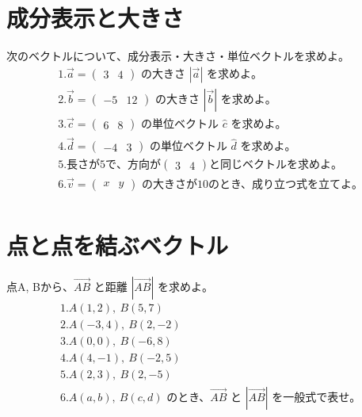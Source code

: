 \documentclass[paper=b4j,landscape,twocolumn,fleqn]{jlreq}
\begin{document}
\section{成分表示と大きさ}
次のベクトルについて、成分表示・大きさ・単位ベクトルを求めよ。
\begin{align*}
　&1.　\vec{a}=\begin{pmatrix}3 & 4\end{pmatrix}\text{ の大きさ }|\vec{a}|\text{ を求めよ。}\\[0.45em]
　&2.　\vec{b}=\begin{pmatrix}-5 & 12\end{pmatrix}\text{ の大きさ }|\vec{b}|\text{ を求めよ。}\\[0.45em]
　&3.　\vec{c}=\begin{pmatrix}6 & 8\end{pmatrix}\text{ の単位ベクトル }\hat{c}\text{ を求めよ。}\\[0.45em]
　&4.　\vec{d}=\begin{pmatrix}-4 & 3\end{pmatrix}\text{ の単位ベクトル }\hat{d}\text{ を求めよ。}\\[0.45em]
　&5.　長さが5で、方向が \begin{pmatrix}3 & 4\end{pmatrix} と同じベクトルを求めよ。\\[0.45em]
　&6.　\vec{v}=\begin{pmatrix}x & y\end{pmatrix}\text{ の大きさが10のとき、成り立つ式を立てよ。}\\[0.45em]
\end{align*}

\section{点と点を結ぶベクトル}
点A, Bから、\(\overrightarrow{AB}\) と距離 \(\left|\overrightarrow{AB}\right|\) を求めよ。
\begin{align*}
　&1.　A(1,2),\ B(5,7)\\[0.45em]
　&2.　A(-3,4),\ B(2,-2)\\[0.45em]
　&3.　A(0,0),\ B(-6,8)\\[0.45em]
　&4.　A(4,-1),\ B(-2,5)\\[0.45em]
　&5.　A(2,3),\ B(2,-5)\\[0.45em]
　&6.　A(a,b),\ B(c,d)\text{ のとき、}\overrightarrow{AB}\text{ と }|\overrightarrow{AB}|\text{ を一般式で表せ。}\\[0.45em]
\end{align*}
\end{document}
